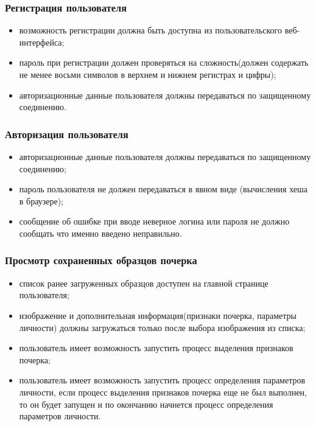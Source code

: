 \subsubsection{Регистрация пользователя}
\label{sec:freq:reg}
\begin{itemize}
	\item возможность регистрации должна быть доступна из пользовательского веб-интерфейса;
	\item пароль при регистрации должен проверяться на сложность(должен содержать не менее восьми символов в верхнем и нижнем регистрах и \mbox{цифры);}
	\item авторизационные данные пользователя должны передаваться по защищенному соединению.
\end{itemize}

\subsubsection{Авторизация пользователя}
\label{sec:freq:auth}
\begin{itemize}
	\item авторизационные данные пользователя должны передаваться по защищенному соединению;
	\item пароль пользователя не должен передаваться в явном виде (вычисления хеша в браузере);
 	\item сообщение об ошибке при вводе неверное логина или пароля не должно сообщать что именно введено неправильно.
\end{itemize}

\subsubsection{Просмотр сохраненных образцов почерка}
\label{sec:freq:show}
\begin{itemize}
	\item список ранее загруженных образцов доступен на главной странице пользователя;
	\item изображение и дополнительная информация(признаки почерка, параметры личности) должны загружаться только после выбора изображения из списка;
	\item пользователь имеет возможность запустить процесс выделения признаков почерка;
	\item пользователь имеет возможность запустить процесс определения параметров личности, если процесс выделения признаков почерка еще не был выполнен, то он будет запущен и по окончанию начнется процесс определения параметров личности.
\end{itemize}


